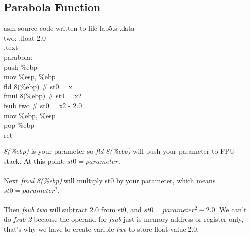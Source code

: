 \documentclass{article}
\begin{document}
\subsection{Parabola Function}
\begin{multicols}{2}
\begin{GFT}{asm source code written to file lab5.s}
\+.data\\
\+two: .float 2.0\\
\+.text\\
\+parabola:\\
\+push \%ebp\\
\+mov \%esp, \%ebp\\
\+fld 8(\%ebp) 		\# st0 = x\\
\+fmul 8(\%ebp)		\# st0 = x\Circumflex{}2\\
\+fsub two		\# st0 = x\Circumflex{}2 - 2.0\\
\+mov \%ebp, \%esp\\
\+pop \%ebp\\
\+ret\\
\end{GFT}
\columnbreak
\textit{8(\%ebp)} is your parameter so \textit{fld 8(\%ebp)} will push your parameter to FPU stack. At this point, $st0 = parameter$. \\ \\
Next \textit{fmul 8(\%ebp)} will multiply st0 by your parameter, which means $st0 = parameter^2$. \\ \\
Then \textit{fsub two} will subtract $2.0$ from st0, and $st0 = parameter^2 - 2.0$. We can't do \textit{fsub 2} because the operand for \textit{fsub} just is memory address or register only, that's why we have to create varible \textit{two} to store float value 2.0.
\end{multicols}
\clearpage
\end{document}
